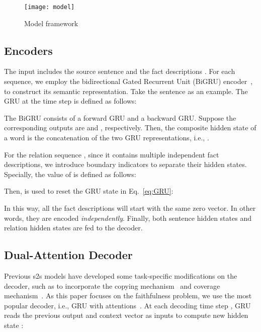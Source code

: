 \documentclass[letterpaper]{article} \usepackage{aaai18}  \usepackage{times}  \usepackage{helvet}  \usepackage{courier}  \usepackage{url}  \usepackage{graphicx}  \usepackage{amsfonts}
\begin{document}
	
	\begin{figure*}
		\centering
		\texttt{[image: model]}
		\caption{Model framework}
		\label{fig:modelframework}
	\end{figure*}
	
	
	\subsection{Encoders}
	The input includes the source sentence  and the fact descriptions .
	For each sequence, we employ the bidirectional Gated Recurrent Unit (BiGRU) encoder~\cite{cho2014learning}, to construct its semantic representation.
	Take the sentence  as an example.
	The GRU at the time step  is defined as follows:

The BiGRU consists of a forward GRU and a backward GRU. 
	Suppose the corresponding outputs are \smash{\scriptscriptstyle\rightarrow}\smash{\scriptscriptstyle\rightarrow} and \smash{\scriptscriptstyle\leftarrow}\smash{\scriptscriptstyle\leftarrow}, respectively.
	Then, the composite hidden state of a word is the concatenation of the two GRU representations, i.e., \smash{\scriptscriptstyle\rightarrow}\smash{\scriptscriptstyle\leftarrow}.
	
	For the relation sequence , since it contains multiple independent fact descriptions, we introduce boundary indicators  to separate their hidden states.
	Specially, the value of  is defined as follows:
	
	Then,  is used to reset the GRU state in Eq.~\ref{eq:GRU}:
	
	In this way, all the fact descriptions will start with the same zero vector.
	In other words, they are encoded \textit{independently}.
	Finally, both sentence hidden states  and relation hidden states  are fed to the decoder. 
	
	\subsection{Dual-Attention Decoder}
	Previous s2s models have developed some task-specific modifications on the decoder, such as to incorporate  the copying mechanism~\cite{gu2016incorporating} and coverage mechanism~\cite{see2017get}.
	As this paper focuses on the faithfulness problem, we use the most popular decoder, i.e., GRU with attentions~\cite{bahdanau2014neural}.
	At each decoding time step , GRU reads the previous output  and context vector  as inputs to compute new hidden state :
	
\end{document}
